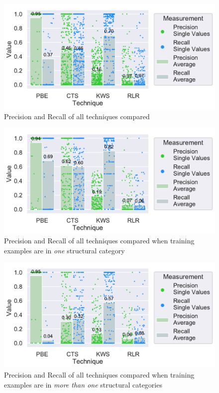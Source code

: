 \documentclass[\myrootdir/main.tex]{subfiles}
\begin{document}
\begin{figure}[htbp]
		\centering
		\includegraphics[width=\textwidth, clip]{img/big-study/recall-precision-all.pdf}
		\caption{Precision and Recall of all techniques compared}
		\label{fig:recall-precision-all}
\end{figure}

\begin{figure}[htbp]
	\centering
		\includegraphics[width=\textwidth, clip]{img/big-study/recall-precision-singlecategory-all.pdf}
		\caption{Precision and Recall of all techniques compared when training examples are in \emph{one} structural category}
		\label{fig:recall-precision-singlecategory-all}
\end{figure}

\begin{figure}[htbp]
		\centering
		\includegraphics[width=\textwidth, clip]{img/big-study/recall-precision-multicategory-all.pdf}
		\caption{Precision and Recall of all techniques compared when training examples are in \emph{more than one} structural categories}
		\label{fig:recall-precision-multicategory-all}
\end{figure}
\end{document}
